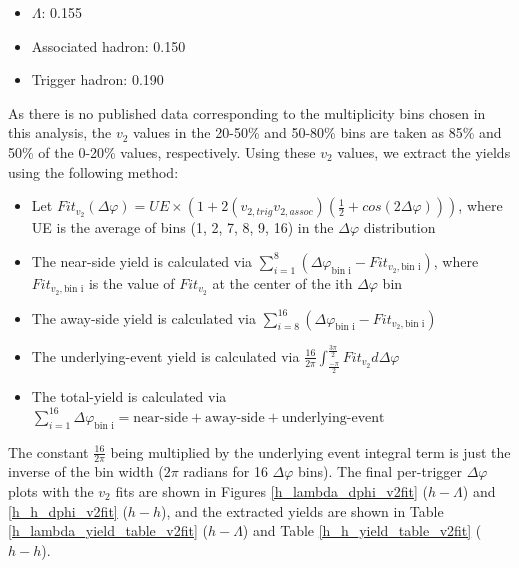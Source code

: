 \documentclass[ALICE,manyauthors]{ALICE_analysis_notes}
\begin{document}
\begin{itemize}
\item $\Lambda$: 0.155
\item Associated hadron: 0.150
\item Trigger hadron: 0.190
\end{itemize}

As there is no published data corresponding to the multiplicity bins chosen in this analysis, the $v_{2}$ values in the 20-50\% and 50-80\% bins are taken as 85\% and 50\% of the 0-20\% values, respectively. Using these $v_{2}$ values, we extract the yields using the following method:

\begin{itemize}
\item Let $Fit_{v_{2}}(\Delta\varphi) = UE\times(1 + 2(v_{2, trig}v_{2, assoc})(\frac{1}{2} + cos(2\Delta\varphi)))$, where UE is the average of bins (1, 2, 7, 8, 9, 16) in the $\Delta\varphi$ distribution
\item The near-side yield is calculated via $\sum_{i=1}^{8} (\Delta\varphi_\text{bin i} - Fit_{v_{2}, \text{bin i}})$, where $Fit_{v_{2}, \text{bin i}}$ is the value of $Fit_{v_{2}}$ at the center of the ith $\Delta\varphi$ bin
\item The away-side yield is calculated via $\sum_{i=8}^{16} (\Delta\varphi_\text{bin i} - Fit_{v_{2}, \text{bin i}})$
\item The underlying-event yield is calculated via $\frac{16}{2\pi}\int_{\frac{-\pi}{2}}^{\frac{3\pi}{2}} Fit_{v_{2}} d\Delta\varphi$
\item The total-yield is calculated via $\sum_{i=1}^{16} \Delta\varphi_\text{bin i} = \text{near-side} + \text{away-side} + \text{underlying-event}$
\end{itemize}

The constant $\frac{16}{2\pi}$ being multiplied by the underlying event integral term is just the inverse of the bin width ($2\pi$ radians for 16 $\Delta\varphi$ bins). The final per-trigger $\Delta\varphi$ plots with the $v_{2}$ fits are shown in Figures \ref{h_lambda_dphi_v2fit} ($h-\Lambda$) and \ref{h_h_dphi_v2fit} ($h-h$), and the extracted yields are shown in Table \ref{h_lambda_yield_table_v2fit} ($h-\Lambda$) and Table \ref{h_h_yield_table_v2fit} ($h-h$). 
\end{document}
